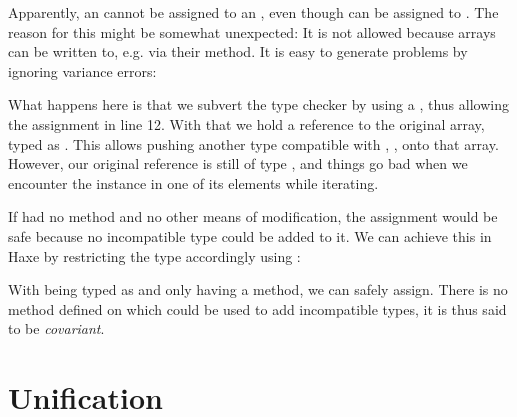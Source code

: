 \documentclass{haxe}
\begin{document}

Apparently, an  cannot be assigned to an , even though  can be assigned to . The reason for this might be somewhat unexpected: It is not allowed because arrays can be written to, e.g. via their  method. It is easy to generate problems by ignoring variance errors:


What happens here is that we subvert the type checker by using a , thus allowing the assignment in line 12. With that we hold a reference  to the original array, typed as . This allows pushing another type compatible with , , onto that array. However, our original reference  is still of type , and things go bad when we encounter the  instance in one of its elements while iterating.

If  had no  method and no other means of modification, the assignment would be safe because no incompatible type could be added to it. We can achieve this in Haxe by restricting the type accordingly using :


With  being typed as  and  only having a  method, we can safely assign. There is no method defined on  which could be used to add incompatible types, it is thus said to be \emph{covariant}.






\section{Unification}
\label{type-system-unification}

\end{document}
